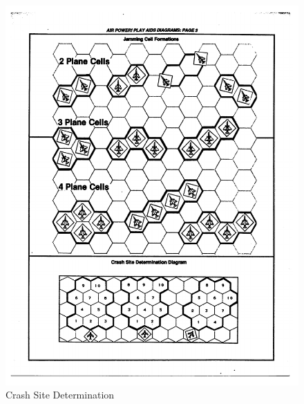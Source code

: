 \documentclass[10pt]{article}
\begin{document}
\begin{figure}
\centering
\caption{Crash Site Determination}
\medskip
\includegraphics[width=0.6\linewidth]{figures/aids-crash-site.pdf}
\end{figure}

































\end{document}
